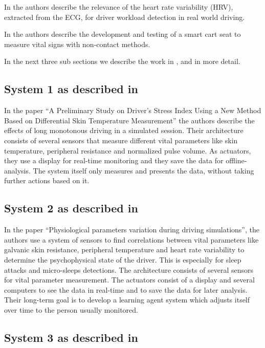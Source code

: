 \documentclass[a4paper]{article}		%
\begin{document}
In \cite{eilebrecht:12} the authors describe the relevance of the heart rate variability (HRV), extracted from the ECG, for driver workload detection in real world driving.

In \cite{walter:11} the authors describe the development and testing of a smart cart seat to measure vital signs with non-contact methods.

In the next three sub sections we describe the work in \cite{yamakoshi:07}, \cite{Zocchi:07} and \cite{angelo:10} in more detail.
\subsection{System 1 as described in\cite{yamakoshi:07}}
\indent
\indent In the paper ``A Preliminary Study on Driver's Stress Index Using a New Method Based on Differential Skin Temperature Measurement'' the authors describe the effects of long monotonous driving in a simulated session. Their architecture consists of several sensors that measure different vital parameters like skin temperature, peripheral resistance and normalized pulse volume. As actuators, they use a display for real-time monitoring and they save the data for offline-analysis.
The system itself only measures and presents the data, without taking further actions based on it.
\subsection{System 2 as described in \cite{Zocchi:07}}
\indent
\indent In the paper ``Physiological parameters variation during driving simulations'', the authors use a system of sensors to find correlations between vital parameters like galvanic skin resistance, peripheral temperature and heart rate variability to determine the psychophysical state of the driver. This is especially for sleep attacks and micro-sleeps detections. The architecture consists of several sensors for vital parameter measurement. The actuators consist of a display and several computers to see the data in real-time and to save the data for later analysis. Their long-term goal is to develop a learning agent system which adjusts itself over time to the person usually monitored.
\subsection{System 3 as described in \cite{angelo:10}}
\indent
\indent 
%
%
\end{document}
